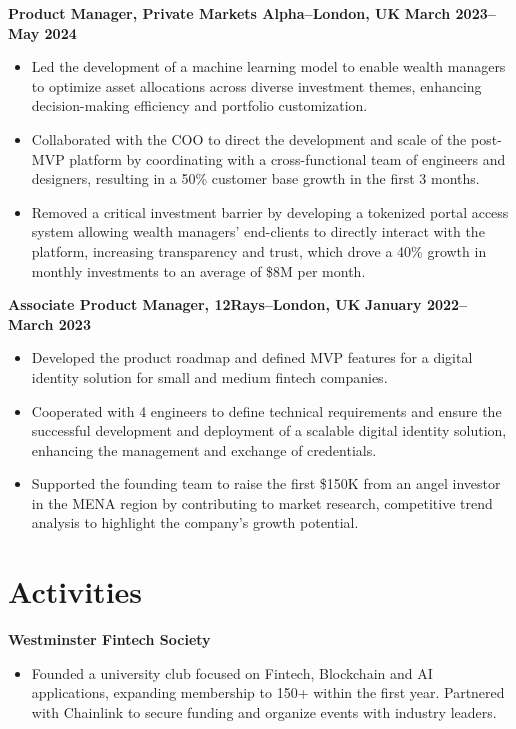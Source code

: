 \documentclass{article}
\begin{document}
\textbf{Product Manager, Private Markets Alpha--London, UK} \hfill \textbf{March 2023--May 2024}
\begin{itemize}[leftmargin=*,noitemsep]
\item Led the development of a machine learning model to enable wealth managers to optimize asset allocations across diverse investment themes, enhancing decision-making efficiency and portfolio customization.
\item Collaborated with the COO to direct the development and scale of the post-MVP platform by coordinating with a cross-functional team of engineers and designers, resulting in a 50\% customer base growth in the first 3 months.
\item Removed a critical investment barrier by developing a tokenized portal access system allowing wealth managers' end-clients to directly interact with the platform, increasing transparency and trust, which drove a 40\% growth in monthly investments to an average of \$8M per month.
\end{itemize}

\textbf{Associate Product Manager, 12Rays--London, UK} \hfill \textbf{January 2022--March 2023}
\begin{itemize}[leftmargin=*,noitemsep]
\item Developed the product roadmap and defined MVP features for a digital identity solution for small and medium fintech companies.
\item Cooperated with 4 engineers to define technical requirements and ensure the successful development and deployment of a scalable digital identity solution, enhancing the management and exchange of credentials.
\item Supported the founding team to raise the first \$150K from an angel investor in the MENA region by contributing to market research, competitive trend analysis to highlight the company's growth potential.
\end{itemize}

\section*{Activities}
\textbf{Westminster Fintech Society}
\begin{itemize}[leftmargin=*,noitemsep]
\item Founded a university club focused on Fintech, Blockchain and AI applications, expanding membership to 150+ within the first year. Partnered with Chainlink to secure funding and organize events with industry leaders.
\end{itemize}
\end{document}

